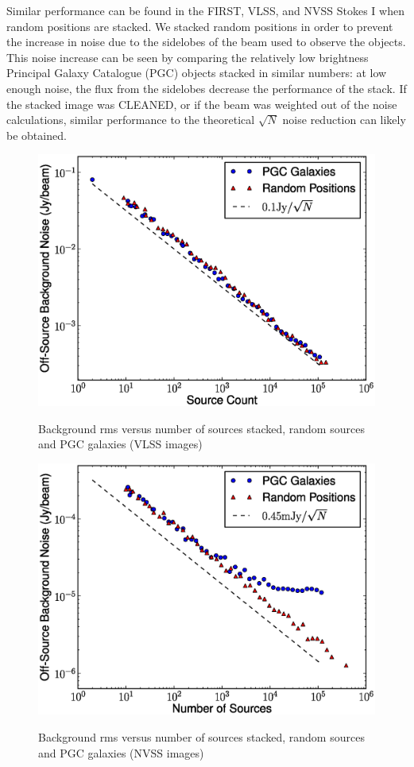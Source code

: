 \documentclass{article}
\begin{document}
Similar performance can be found in the FIRST, VLSS, and NVSS Stokes I 
when random positions are stacked.  We stacked random positions in order to 
prevent the increase in noise due to the sidelobes of the beam used to observe
the objects.  This noise increase can be seen by comparing the relatively low 
brightness Principal Galaxy Catalogue (PGC) objects stacked in similar numbers: at
low enough noise, the flux from the sidelobes decrease the performance of the 
stack.  If the stacked image was CLEANED, or if the beam was weighted out of the
noise calculations, similar performance to the theoretical $\sqrt{N}$ noise 
reduction can likely be obtained.
\begin{figure}[H]
\centering
\includegraphics[trim=0cm 0cm 0cm 1cm, clip, scale=0.7]{VLSS_noise_vs_num.eps}\\
\caption[Stacking Performance for VLSS]{Background rms versus number of 
sources stacked, random sources and PGC galaxies (VLSS images)}
\end{figure}

\begin{figure}[H]
\centering
\includegraphics[trim=0cm 0cm 0cm 1cm, clip, scale=0.7]{NVSS_noise_vs_num.eps}\\
\caption[Stacking Performance for NVSS I]{Background rms versus number of 
sources stacked, random sources and PGC galaxies (NVSS images)}
\end{figure}
\end{document}
